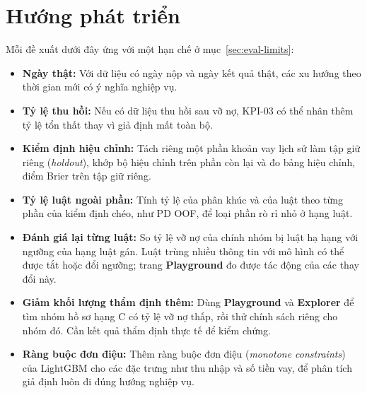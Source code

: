 \section{Hướng phát triển}
\label{sec:eval-future}

Mỗi đề xuất dưới đây ứng với một hạn chế ở mục~\ref{sec:eval-limits}:
\begin{itemize}[topsep=0pt, itemsep=1pt]
	\item \textbf{Ngày thật:} Với dữ liệu có ngày nộp và ngày kết quả thật, các xu hướng theo thời gian mới có ý nghĩa nghiệp vụ.
	\item \textbf{Tỷ lệ thu hồi:} Nếu có dữ liệu thu hồi sau vỡ nợ, KPI-03 có thể nhân thêm tỷ lệ tổn thất thay vì giả định mất toàn bộ.
	\item \textbf{Kiểm định hiệu chỉnh:} Tách riêng một phần khoản vay lịch sử làm tập giữ riêng (\textit{holdout}), khớp bộ hiệu chỉnh trên phần còn lại và đo bảng hiệu chỉnh, điểm Brier trên tập giữ riêng.
	\item \textbf{Tỷ lệ luật ngoài phần:} Tính tỷ lệ của phân khúc và của luật theo từng phần của kiểm định chéo, như PD OOF, để loại phần rò rỉ nhỏ ở hạng luật.
	\item \textbf{Đánh giá lại từng luật:} So tỷ lệ vỡ nợ của chính nhóm bị luật hạ hạng với ngưỡng của hạng luật gán. Luật trùng nhiều thông tin với mô hình có thể được tắt hoặc đổi ngưỡng; trang \textbf{Playground} đo được tác động của các thay đổi này.
	\item \textbf{Giảm khối lượng thẩm định thêm:} Dùng \textbf{Playground} và \textbf{Explorer} để tìm nhóm hồ sơ hạng C có tỷ lệ vỡ nợ thấp, rồi thử chính sách riêng cho nhóm đó. Cần kết quả thẩm định thực tế để kiểm chứng.
	\item \textbf{Ràng buộc đơn điệu:} Thêm ràng buộc đơn điệu (\textit{monotone constraints}) của LightGBM cho các đặc trưng như thu nhập và số tiền vay, để phân tích giả định luôn đi đúng hướng nghiệp vụ.
\end{itemize}
